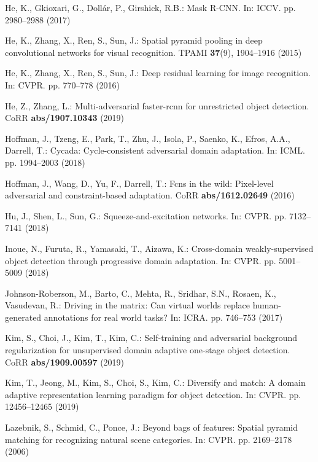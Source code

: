 \documentclass[runningheads]{llncs}
\begin{document}
\begin{thebibliography}{10}
He, K., Gkioxari, G., Doll{\'{a}}r, P., Girshick, R.B.: Mask {R-CNN}. In: ICCV.
  pp. 2980--2988 (2017)

He, K., Zhang, X., Ren, S., Sun, J.: Spatial pyramid pooling in deep
  convolutional networks for visual recognition. TPAMI  \textbf{37}(9),
  1904--1916 (2015)

He, K., Zhang, X., Ren, S., Sun, J.: Deep residual learning for image
  recognition. In: CVPR. pp. 770--778 (2016)

He, Z., Zhang, L.: Multi-adversarial faster-rcnn for unrestricted object
  detection. CoRR  \textbf{abs/1907.10343} (2019)

Hoffman, J., Tzeng, E., Park, T., Zhu, J., Isola, P., Saenko, K., Efros, A.A.,
  Darrell, T.: Cycada: Cycle-consistent adversarial domain adaptation. In:
  ICML. pp. 1994--2003 (2018)

Hoffman, J., Wang, D., Yu, F., Darrell, T.: Fcns in the wild: Pixel-level
  adversarial and constraint-based adaptation. CoRR  \textbf{abs/1612.02649}
  (2016)

Hu, J., Shen, L., Sun, G.: Squeeze-and-excitation networks. In: CVPR. pp.
  7132--7141 (2018)

Inoue, N., Furuta, R., Yamasaki, T., Aizawa, K.: Cross-domain weakly-supervised
  object detection through progressive domain adaptation. In: CVPR. pp.
  5001--5009 (2018)

Johnson{-}Roberson, M., Barto, C., Mehta, R., Sridhar, S.N., Rosaen, K.,
  Vasudevan, R.: Driving in the matrix: Can virtual worlds replace
  human-generated annotations for real world tasks? In: ICRA. pp. 746--753
  (2017)

Kim, S., Choi, J., Kim, T., Kim, C.: Self-training and adversarial background
  regularization for unsupervised domain adaptive one-stage object detection.
  CoRR  \textbf{abs/1909.00597} (2019)

Kim, T., Jeong, M., Kim, S., Choi, S., Kim, C.: Diversify and match: {A} domain
  adaptive representation learning paradigm for object detection. In: CVPR. pp.
  12456--12465 (2019)

Lazebnik, S., Schmid, C., Ponce, J.: Beyond bags of features: Spatial pyramid
  matching for recognizing natural scene categories. In: CVPR. pp. 2169--2178
  (2006)


\end{thebibliography}
\end{document}
